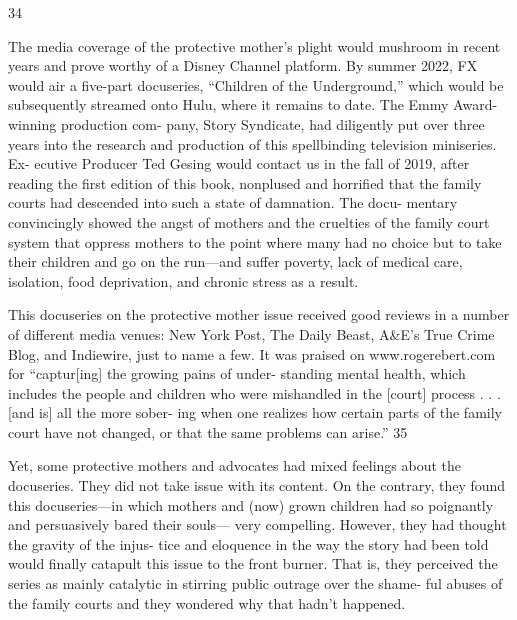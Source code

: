  34 \pfl{}



The media coverage of the protective mother’s plight would mushroom
in recent years and prove worthy of a Disney Channel platform. By
summer 2022, FX would air a five-part docuseries, “Children of the
Underground,” which would be subsequently streamed onto Hulu,
where it remains to date. The Emmy Award-winning production com-
pany, Story Syndicate, had diligently put over three years into the
research and production of this spellbinding television miniseries. Ex-
ecutive Producer Ted Gesing would contact us in the fall of 2019, after
reading the first edition of this book, nonplused and horrified that the
family courts had descended into such a state of damnation. The docu-
mentary convincingly showed the angst of mothers and the cruelties of
the family court system that oppress mothers to the point where many
had no choice but to take their children and go on the run—and suffer
poverty, lack of medical care, isolation, food deprivation, and chronic
stress as a result. \pfl{}


This docuseries on the protective mother issue received good reviews
in a number of different media venues: New York Post, The Daily Beast,
A\&E’s True Crime Blog, and Indiewire, just to name a few. It was praised
on www.rogerebert.com for “captur[ing] the growing pains of under-
standing mental health, which includes the people and children who
were mishandled in the [court] process . . . [and is] all the more sober-
ing when one realizes how certain parts of the family court have not
changed, or that the same problems can arise.” 35 \pfl{}


Yet, some protective mothers and advocates had mixed feelings
about the docuseries. They did not take issue with its content. On the
contrary, they found this docuseries—in which mothers and (now)
grown children had so poignantly and persuasively bared their souls—
very compelling. However, they had thought the gravity of the injus-
tice and eloquence in the way the story had been told would finally
catapult this issue to the front burner. That is, they perceived the
series as mainly catalytic in stirring public outrage over the shame-
ful abuses of the family courts and they wondered why that hadn’t
happened. \pfl{}


